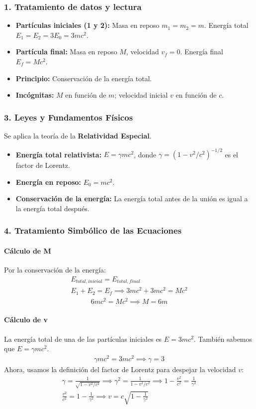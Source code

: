 \subsubsection*{1. Tratamiento de datos y lectura}
\begin{itemize}
    \item \textbf{Partículas iniciales (1 y 2):} Masa en reposo $m_1=m_2=m$. Energía total $E_1=E_2=3E_0 = 3mc^2$.
    \item \textbf{Partícula final:} Masa en reposo $M$, velocidad $v_f=0$. Energía final $E_f = Mc^2$.
    \item \textbf{Principio:} Conservación de la energía total.
    \item \textbf{Incógnitas:} $M$ en función de $m$; velocidad inicial $v$ en función de $c$.
\end{itemize}
\subsubsection*{3. Leyes y Fundamentos Físicos}
Se aplica la teoría de la \textbf{Relatividad Especial}.
\begin{itemize}
    \item \textbf{Energía total relativista:} $E = \gamma mc^2$, donde $\gamma = (1-v^2/c^2)^{-1/2}$ es el factor de Lorentz.
    \item \textbf{Energía en reposo:} $E_0 = mc^2$.
    \item \textbf{Conservación de la energía:} La energía total antes de la unión es igual a la energía total después.
\end{itemize}
\subsubsection*{4. Tratamiento Simbólico de las Ecuaciones}
\paragraph{Cálculo de M}
Por la conservación de la energía:
\begin{gather}
    E_{total, inicial} = E_{total, final} \\
    E_1 + E_2 = E_f \implies 3mc^2 + 3mc^2 = Mc^2 \nonumber
\end{gather}
\begin{gather}
    6mc^2 = Mc^2 \implies M = 6m
\end{gather}
\paragraph{Cálculo de v}
La energía total de una de las partículas iniciales es $E = 3mc^2$. También sabemos que $E=\gamma mc^2$.
\begin{gather}
    \gamma mc^2 = 3mc^2 \implies \gamma = 3
\end{gather}
Ahora, usamos la definición del factor de Lorentz para despejar la velocidad $v$:
\begin{gather}
    \gamma = \frac{1}{\sqrt{1-v^2/c^2}} \implies \gamma^2 = \frac{1}{1-v^2/c^2} \implies 1-\frac{v^2}{c^2} = \frac{1}{\gamma^2} \nonumber \\
    \frac{v^2}{c^2} = 1 - \frac{1}{\gamma^2} \implies v = c\sqrt{1-\frac{1}{\gamma^2}}
\end{gather}
